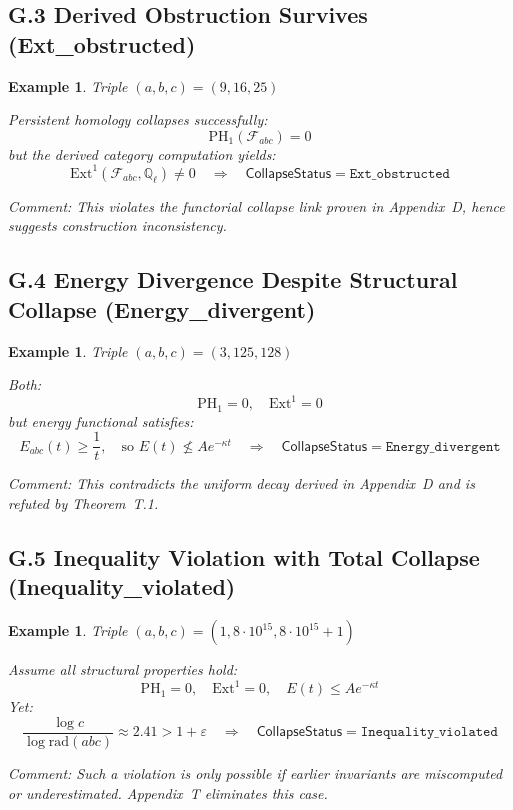 \documentclass[11pt]{article}
\newtheorem{example}[theorem]{Example}
\begin{document}
\subsection*{G.3 Derived Obstruction Survives (Ext\_obstructed)}

\begin{example}
Triple \( (a,b,c) = (9,16,25) \)

Persistent homology collapses successfully:
\[
\mathrm{PH}_1(\mathcal{F}_{abc}) = 0
\]
but the derived category computation yields:
\[
\mathrm{Ext}^1(\mathcal{F}_{abc}, \mathbb{Q}_\ell) \neq 0
\quad \Rightarrow \quad \mathsf{CollapseStatus} = \texttt{Ext\_obstructed}
\]

\textit{Comment: This violates the functorial collapse link proven in Appendix~D, hence suggests construction inconsistency.}
\end{example}

\subsection*{G.4 Energy Divergence Despite Structural Collapse (Energy\_divergent)}

\begin{example}
Triple \( (a,b,c) = (3,125,128) \)

Both:
\[
\mathrm{PH}_1 = 0,\quad \mathrm{Ext}^1 = 0
\]
but energy functional satisfies:
\[
E_{abc}(t) \geq \frac{1}{t}, \quad \text{so } E(t) \not\leq A e^{-\kappa t}
\quad \Rightarrow \quad \mathsf{CollapseStatus} = \texttt{Energy\_divergent}
\]

\textit{Comment: This contradicts the uniform decay derived in Appendix~D and is refuted by Theorem~T.1.}
\end{example}

\subsection*{G.5 Inequality Violation with Total Collapse (Inequality\_violated)}

\begin{example}
Triple \( (a,b,c) = (1, 8 \cdot 10^{15}, 8 \cdot 10^{15} + 1) \)

Assume all structural properties hold:
\[
\mathrm{PH}_1 = 0,\quad \mathrm{Ext}^1 = 0,\quad E(t) \leq A e^{-\kappa t}
\]
Yet:
\[
\frac{\log c}{\log \mathrm{rad}(abc)} \approx 2.41 > 1 + \varepsilon
\quad \Rightarrow \quad \mathsf{CollapseStatus} = \texttt{Inequality\_violated}
\]

\textit{Comment: Such a violation is only possible if earlier invariants are miscomputed or underestimated. Appendix~T eliminates this case.}
\end{example}
\end{document}
